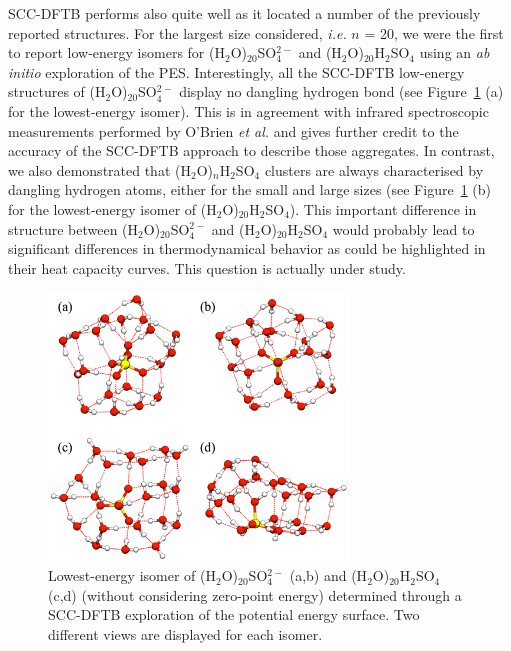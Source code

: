 \documentclass[]{interact}
\theoremstyle{plain}%
\theoremstyle{definition}
\theoremstyle{remark}
\begin{document}
SCC-DFTB performs also quite well as it located a number of the previously reported structures. For the largest size considered,
\textit{i.e.} $n$ = 20, we were the first to report low-energy isomers for (H$_{2}$O)$_{20}$SO$_{4}^{2-}$ and (H$_{2}$O)$_{20}$H$_{2}$SO$_{4}$
using an \textit{ab initio} exploration of the PES. Interestingly, all the SCC-DFTB low-energy structures of (H$_{2}$O)$_{20}$SO$_{4}^{2-}$
display no dangling hydrogen bond (see Figure~\ref{large_soufre} (a) for the lowest-energy isomer). This is in agreement with infrared
spectroscopic measurements performed by O'Brien \textit{et al.} \cite{brein1} and gives further credit to the accuracy of the
SCC-DFTB approach to describe those aggregates. In contrast, we also demonstrated that (H$_{2}$O)$_{n}$H$_{2}$SO$_{4}$
clusters are always characterised by dangling hydrogen atoms, either for the small and large sizes (see Figure~\ref{large_soufre} (b)
for the lowest-energy isomer of (H$_{2}$O)$_{20}$H$_{2}$SO$_{4}$). This important difference in structure between
(H$_{2}$O)$_{20}$SO$_{4}^{2-}$ and (H$_{2}$O)$_{20}$H$_{2}$SO$_{4}$ would probably lead to significant differences in
thermodynamical behavior as could be highlighted in their heat capacity curves. This question is actually under study.

\begin{figure}
\begin{center}
\includegraphics[width=8cm]{sulfate.png}
\end{center}
\caption{Lowest-energy isomer of   (H$_{2}$O)$_{20}$SO$_{4}^{2-}$ (a,b) and (H$_{2}$O)$_{20}$H$_{2}$SO$_{4}$ (c,d) (without considering
zero-point energy) determined through a SCC-DFTB exploration of the potential energy surface. Two different views are displayed for each isomer.}
\label{large_soufre}
\end{figure}
\end{document}
